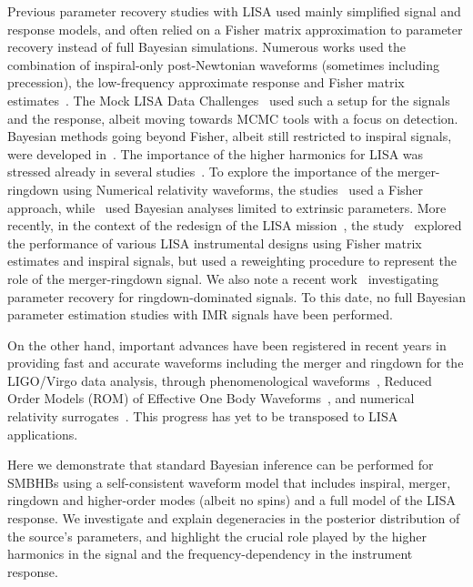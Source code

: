 \documentclass[aps,showpacs,twocolumn,prd,superscriptaddress,nofootinbib]{revtex4-1}
\begin{document}
Previous parameter recovery studies with LISA used mainly simplified signal and response models, and often relied on a Fisher matrix approximation to parameter recovery instead of full Bayesian simulations. Numerous works used the combination of inspiral-only post-Newtonian waveforms (sometimes including precession), the low-frequency approximate response and Fisher matrix estimates~\cite{Cutler97, Vecchio03, Arun06, Berti+04, LangHughes06}. The Mock LISA Data Challenges~\cite{MLDC09} used such a setup for the signals and the response, albeit moving towards MCMC tools with a focus on detection. Bayesian methods going beyond Fisher, albeit still restricted to inspiral signals, were developed in~\cite{Brown+07, CornishPorter06a, Crowder+06, Wickham+06, Roever+07, Feroz+09, GairPorter09, Petiteau+09, PorterCarre13, PorterCornish15}. The importance of the higher harmonics for LISA was stressed already in several studies~\cite{Arun+07a, TriasSintes07, PorterCornish08, McWilliams+09}. To explore the importance of the merger-ringdown using Numerical relativity waveforms, the studies~\cite{Thorpe+08, McWilliams+09, McWilliams+10, McWilliams+11} used a Fisher approach, while~\cite{Babak+08} used Bayesian analyses limited to extrinsic parameters. More recently, in the context of the redesign of the LISA mission~\cite{elisa13}, the study~\cite{Klein+15} explored the performance of various LISA instrumental designs using Fisher matrix estimates and inspiral signals, but used a reweighting procedure to represent the role of the merger-ringdown signal. We also note a recent work~\cite{Baibhav+20} investigating parameter recovery for ringdown-dominated signals. To this date, no full Bayesian parameter estimation studies with IMR signals have been performed.

On the other hand, important advances have been registered in recent years in providing fast and accurate waveforms including the merger and ringdown for the LIGO/Virgo data analysis, through phenomenological waveforms~\cite{Khan+15, London+17}, Reduced Order Models (ROM) of Effective One Body Waveforms~\cite{Puerrer14, Bohe+16}, and numerical relativity surrogates~\cite{Blackman+17b, Varma+18}. This progress has yet to be transposed to LISA applications.

Here we demonstrate that standard Bayesian inference can be performed for SMBHBs using a self-consistent waveform model that includes inspiral, merger, ringdown and higher-order modes (albeit no spins) and a full model of the LISA response. We investigate and explain degeneracies in the posterior distribution of the source's parameters, and highlight the crucial role played by the higher harmonics in the signal and the frequency-dependency in the instrument response.
\end{document}
